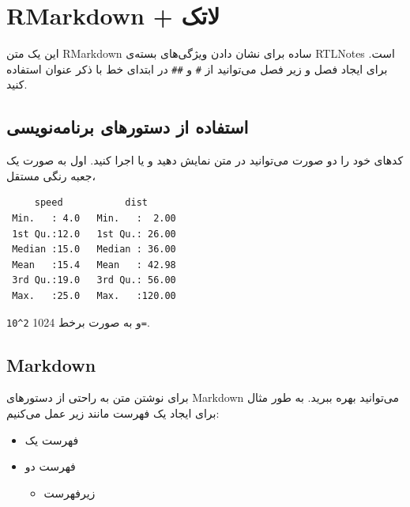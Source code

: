 \documentclass[
]{article}
\providecommand{\tightlist}{%
  \setlength{\itemsep}{0pt}\setlength{\parskip}{0pt}}
\begin{document}






{
\setcounter{tocdepth}{3}
\tableofcontents
}




\hypertarget{rmarkdown-ux644ux627ux62aux6a9}{%
\section{RMarkdown + لاتک}\label{rmarkdown-ux644ux627ux62aux6a9}}

این یک متن RMarkdown ساده برای نشان دادن ویژگی‌های بسته‌ی RTLNotes است.
برای ایجاد فصل و زیر فصل می‌توانید از ‍‍‍‍‍‍\texttt{\#} و \texttt{\#\#}
در ابتدای خط با ذکر عنوان استفاده کنید.

\hypertarget{ux627ux633ux62aux641ux627ux62fux647-ux627ux632-ux62fux633ux62aux648ux631ux647ux627ux6cc-ux628ux631ux646ux627ux645ux647ux646ux648ux6ccux633ux6cc}{%
\subsection{استفاده از دستورهای
برنامه‌نویسی}\label{ux627ux633ux62aux641ux627ux62fux647-ux627ux632-ux62fux633ux62aux648ux631ux647ux627ux6cc-ux628ux631ux646ux627ux645ux647ux646ux648ux6ccux633ux6cc}}

کدهای خود را دو صورت می‌توانید در متن نمایش دهید و یا اجرا کنید. اول به
صورت یک جعبه رنگی مستقل،

\begin{verbatim}
     speed           dist       
 Min.   : 4.0   Min.   :  2.00  
 1st Qu.:12.0   1st Qu.: 26.00  
 Median :15.0   Median : 36.00  
 Mean   :15.4   Mean   : 42.98  
 3rd Qu.:19.0   3rd Qu.: 56.00  
 Max.   :25.0   Max.   :120.00  
\end{verbatim}

و به صورت برخط 1024 \texttt{2\^{}10=}.

\hypertarget{markdown}{%
\subsection{Markdown}\label{markdown}}

برای نوشتن متن به راحتی از دستورهای Markdown می‌توانید بهره ببرید. به
طور مثال برای ایجاد یک فهرست مانند زیر عمل می‌کنیم:

\begin{itemize}
\tightlist
\item
  فهرست یک
\item
  فهرست دو

  \begin{itemize}
  \tightlist
  \item
    زیرفهرست
  \end{itemize}
\end{itemize}
\end{document}
